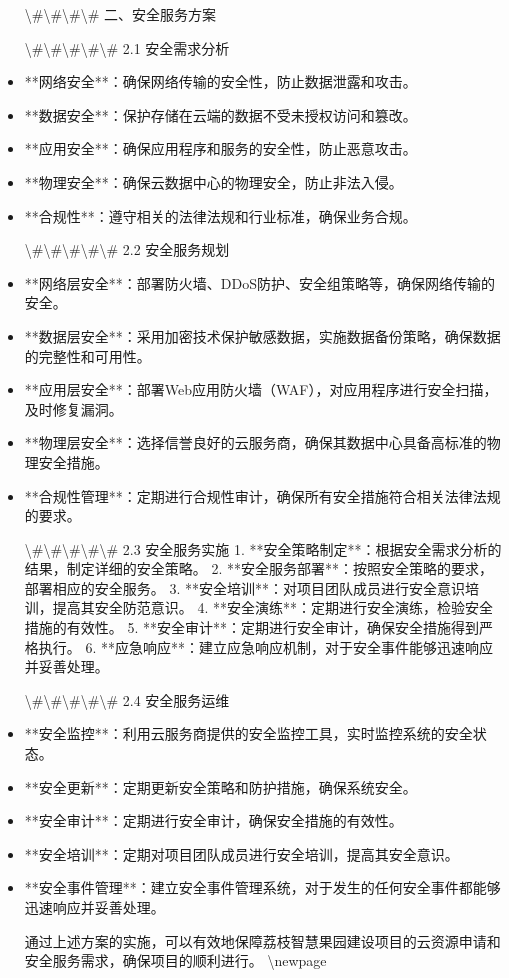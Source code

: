 \documentclass[UTF8,a4paper,zihao=-4]{ctexart}
\begin{document}
\begin{itemize}
\textbackslash{}#\textbackslash{}#\textbackslash{}#\textbackslash{}# 二、安全服务方案

\textbackslash{}#\textbackslash{}#\textbackslash{}#\textbackslash{}#\textbackslash{}# 2.1 安全需求分析
\item **网络安全**：确保网络传输的安全性，防止数据泄露和攻击。
\item **数据安全**：保护存储在云端的数据不受未授权访问和篡改。
\item **应用安全**：确保应用程序和服务的安全性，防止恶意攻击。
\item **物理安全**：确保云数据中心的物理安全，防止非法入侵。
\item **合规性**：遵守相关的法律法规和行业标准，确保业务合规。

\textbackslash{}#\textbackslash{}#\textbackslash{}#\textbackslash{}#\textbackslash{}# 2.2 安全服务规划
\item **网络层安全**：部署防火墙、DDoS防护、安全组策略等，确保网络传输的安全。
\item **数据层安全**：采用加密技术保护敏感数据，实施数据备份策略，确保数据的完整性和可用性。
\item **应用层安全**：部署Web应用防火墙（WAF），对应用程序进行安全扫描，及时修复漏洞。
\item **物理层安全**：选择信誉良好的云服务商，确保其数据中心具备高标准的物理安全措施。
\item **合规性管理**：定期进行合规性审计，确保所有安全措施符合相关法律法规的要求。

\textbackslash{}#\textbackslash{}#\textbackslash{}#\textbackslash{}#\textbackslash{}# 2.3 安全服务实施
1. **安全策略制定**：根据安全需求分析的结果，制定详细的安全策略。
2. **安全服务部署**：按照安全策略的要求，部署相应的安全服务。
3. **安全培训**：对项目团队成员进行安全意识培训，提高其安全防范意识。
4. **安全演练**：定期进行安全演练，检验安全措施的有效性。
5. **安全审计**：定期进行安全审计，确保安全措施得到严格执行。
6. **应急响应**：建立应急响应机制，对于安全事件能够迅速响应并妥善处理。

\textbackslash{}#\textbackslash{}#\textbackslash{}#\textbackslash{}#\textbackslash{}# 2.4 安全服务运维
\item **安全监控**：利用云服务商提供的安全监控工具，实时监控系统的安全状态。
\item **安全更新**：定期更新安全策略和防护措施，确保系统安全。
\item **安全审计**：定期进行安全审计，确保安全措施的有效性。
\item **安全培训**：定期对项目团队成员进行安全培训，提高其安全意识。
\item **安全事件管理**：建立安全事件管理系统，对于发生的任何安全事件都能够迅速响应并妥善处理。

通过上述方案的实施，可以有效地保障荔枝智慧果园建设项目的云资源申请和安全服务需求，确保项目的顺利进行。
\textbackslash{}newpage

\end{itemize}
\end{document}
